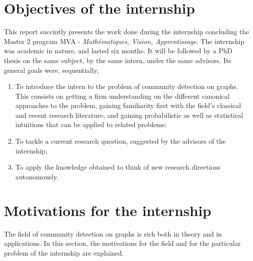 \documentclass[../../main.tex]{subfiles} %
\begin{document}
\section{Objectives of the internship}
This report succintly presents the work done during the internship 
concluding the Master 2 program MVA - \textit{Mathématiques, Vision, 
Apprentissage}. The internship was academic in nature, and lasted six months. 
It will be followed by a PhD thesis on the same subject, by the same intern, 
under the same advisors. Its general goals were, sequentially,
\begin{enumerate}[label=\raisenth*]
	\item To introduce the intern to the problem of community detection on 
	graphs. This consists on getting a firm understanding on the different 
	canonical approaches to the problem, gaining familiarity first with the 
	field's classical and recent research literature, and gaining probabilistic 
	as well as statistical intuitions that can be applied to related problems;
	\item To tackle a current research question, suggested by the advisors of 
	the internship;
	\item To apply the knowledge obtained to think of new research 
	directions autonomously.
\end{enumerate}

\section{Motivations for the internship}
The field of community detection on graphs is rich both in theory and in 
applications. In this section, the motivations for the field and for the 
particular problem of the internship are explained.
\end{document}
